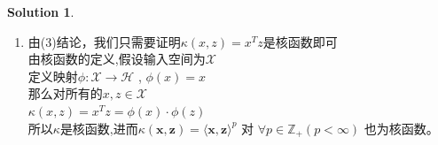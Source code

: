 \documentclass[a4paper,UTF8]{article}
\numberwithin{equation}{section}
\theoremstyle{definition}
\newtheorem*{solution}{Solution}
\def \y {\mathbf{y}}
\def \x {\mathbf{x}}
\def \z {\mathbf{z}}
\begin{document}
\begin{solution}
\begin{enumerate}
\begin{align*}
\begin{bmatrix}
				\y_1 & & \\
				& \ddots & \\
				& & \y_m
			\end{bmatrix} \mathbf{C}^T\mathbf{C} \begin{bmatrix}
				\y_1 & & \\
				& \ddots & \\
				& & \y_m
			\end{bmatrix} \mathbf{D}^T\mathbf{D} \right) \\
			&\text{由于以上矩阵均为方阵，且交换矩阵乘法顺序不改变矩阵的迹，所以} \\
			&= \text{tr}\left( \left(\mathbf{C}\begin{bmatrix}
				\y_1 & & \\
				& \ddots & \\
				& & \y_m
			\end{bmatrix} \mathbf{D}^T \right)^T \mathbf{C} \begin{bmatrix}
				\y_1 & & \\
				& \ddots & \\
				& & \y_m
			\end{bmatrix} \mathbf{D}^T \right) \\
			&= \text{tr} (\mathbf{Q}^T\mathbf{Q}) \geq 0
		\end{align*}
		所以核矩阵是半正定的，所以 $\kappa(\x,\z) = \kappa_1\bigotimes \kappa_2(\x,\z)$也是核函数.
		\item[(4)]  
		由(3)结论，我们只需要证明$\kappa(x, z) = x^{T}z$是核函数即可\\
		由核函数的定义,假设输入空间为$\mathcal{X}$\\
		定义映射$\phi: \mathcal{X} \rightarrow \mathcal{H}$ ,
		$\phi (x) = x$ \\
		那么对所有的$x,z\in \mathcal{X}$\\
		$\kappa(x, z) = x^{T}z = \phi (x)\cdot\phi (z)$\\
		所以$\kappa$是核函数,进而$\kappa(\x, \z) = \langle\x, \z\rangle^p$ 对 $\forall p\in\mathbb{Z}_+(p<\infty)$ 也为核函数。
	\end{enumerate}
	\end{solution}

	
\end{document}
